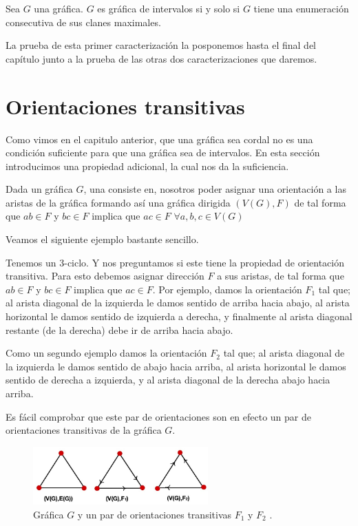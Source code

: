 \begin{teorema}
    \label{teo:Int-MaxClns}
    Sea $G$ una gráfica. $G$ es gráfica de intervalos si y solo si $G$ tiene una
    enumeración consecutiva de sus clanes maximales.
\end{teorema}

La prueba de esta primer caracterización la posponemos hasta el final del
capítulo junto a la prueba de las otras dos caracterizaciones que daremos.

\section{Orientaciones transitivas}
Como vimos en el capitulo anterior, que una gráfica sea cordal no es una
condición suficiente para que una gráfica sea de intervalos. En esta sección
introducimos una propiedad adicional, la cual nos da la suficiencia.

Dada un gráfica $G$, una  consiste en, nosotros
poder asignar una orientación a las aristas de la gráfica formando así una
gráfica dirigida $(V(G),F)$ de tal forma que $ab\in F$ y $bc\in F$ implica que
$ac\in F$ $\forall a,b,c \in V(G)$

Veamos el siguiente ejemplo bastante sencillo.

Tenemos un 3-ciclo. Y nos preguntamos si este tiene la propiedad de orientación
transitiva. Para esto debemos asignar dirección $F$ a sus aristas, de tal forma
que $ab\in F$ y $bc\in F$ implica que $ac\in F$. Por ejemplo, damos la
orientación $F_1$ tal que; al arista diagonal de la izquierda le damos sentido
de arriba hacia abajo, al arista horizontal le damos sentido de izquierda a
derecha, y finalmente al arista diagonal restante (de la derecha) debe ir de
arriba hacia abajo.
    
Como un segundo ejemplo damos la orientación $F_2$ tal que; al arista diagonal
de la izquierda le damos sentido de abajo hacia arriba, al arista horizontal le
damos sentido de derecha a izquierda, y al arista diagonal de la derecha abajo
hacia arriba.

Es fácil comprobar que este par de orientaciones son en efecto un par de
orientaciones transitivas de la gráfica $G$.


\begin{figure}[H]
  \centering
  \includegraphics[width=0.6\textwidth]{recursos/capturas/205.jpg}
  \caption{ Gráfica $G$ y un par de orientaciones transitivas $F_1$ y $F_2$ .}
  \label{fig:GrfTrnsOrtbl}
\end{figure}


